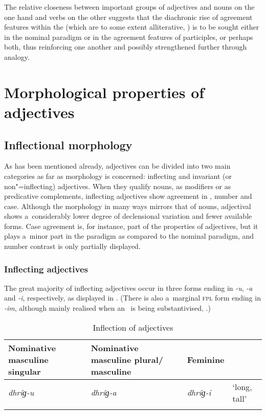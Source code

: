 The relative closeness between important groups of adjectives and nouns on the one hand and verbs on the other suggests that the diachronic rise of agreement features within the   (which are to some extent alliterative, \citealt[87]{corbett2006}) is to be sought either in the nominal paradigm or in the agreement features of participles, or perhaps both, thus reinforcing one another and possibly strengthened further through analogy.


\section{Morphological properties of adjectives}
\label{sec:6-3}

\subsection{Inflectional morphology}
\label{subsec:6-3-1}

As has been mentioned already, adjectives can be divided into two main categories as far as morphology is concerned: inflecting and invariant (or non"=inflecting) adjectives. When they qualify nouns, as modifiers or as predicative complements, inflecting adjectives show agreement in , number and case. Although the  morphology in many ways mirrors that of nouns, adjectival  shows a~considerably lower degree of declensional variation and fewer available forms. Case agreement is, for instance, part of the  properties of adjectives, but it plays a~minor part in the paradigm as compared to the nominal paradigm, and number contrast is only partially displayed.

\subsubsection*{Inflecting adjectives}

The great majority of inflecting adjectives occur in three forms ending in \textit{-u}, \textit{-a} and \textit{-i}, respectively, as displayed in . (There is also a~marginal \textsc{fpl} form ending in \textit{-im}, although mainly realised when an~ is being substantivised, .)


\begin{table}[ht]
\caption{Inflection of adjectives}
\begin{tabularx}{\textwidth}{ Q Q l l }
\lsptoprule
Nominative masculine singular &
Nominative masculine plural/ masculine &
Feminine &
\\\hline
\textit{dhríɡ-u} &
\textit{dhríɡ-a} &
\textit{dhríɡ-i} &
`long, tall'\\\lspbottomrule
\end{tabularx}
\label{tab:6-2}
\end{table}


